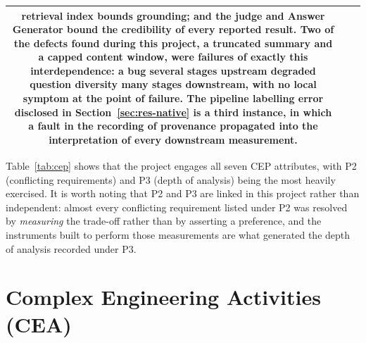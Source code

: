 {\begin{longtable}{|c|p{3.4cm}|p{8.4cm}|}
retrieval index bounds grounding; and the judge and Answer Generator bound the
credibility of every reported result. Two of the defects found during this project, a truncated summary and a capped content window, were failures of exactly this
interdependence: a bug several stages upstream degraded question diversity many
stages downstream, with no local symptom at the point of failure. The pipeline
labelling error disclosed in Section~\ref{sec:res-native} is a third instance, in
which a fault in the recording of provenance propagated into the interpretation of
every downstream measurement. \\
\hline
\end{longtable}
}

Table~\ref{tab:cep} shows that the project engages all seven CEP attributes, with P2
(conflicting requirements) and P3 (depth of analysis) being the most heavily
exercised. It is worth noting that P2 and P3 are linked in this project rather than
independent: almost every conflicting requirement listed under P2 was resolved by
\emph{measuring} the trade-off rather than by asserting a preference, and the
instruments built to perform those measurements are what generated the depth of
analysis recorded under P3.

\section{Complex Engineering Activities (CEA)}
\label{sec:cea}

